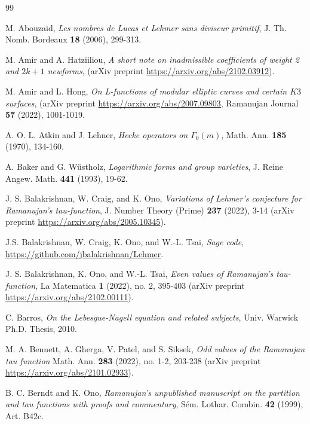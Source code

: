 \documentclass[12pt]{amsart}
\newcommand{\?}{\color{red}?}
\numberwithin{equation}{section}
\begin{document}
\begin{thebibliography}{99}

 M. Abouzaid, \emph{Les nombres de Lucas et Lehmer sans diviseur primitif},
J. Th. Nomb. Bordeaux \textbf{18} (2006), 299-313.

 M. Amir and A. Hatziiliou, \emph{A short note on inadmissible coefficients of weight 2 and $2k+1$ newforms}, (arXiv preprint \url{https://arxiv.org/abs/2102.03912}).

  M. Amir and L. Hong, \emph{On L-functions of modular elliptic curves and certain $K3$ surfaces}, (arXiv preprint \url{https://arxiv.org/abs/2007.09803},   Ramanujan Journal \textbf{57} (2022), 1001-1019.    



 A. O. L. Atkin and J. Lehner, \emph{Hecke operators on $\Gamma_0(m)$},
Math. Ann. \textbf{185} (1970), 134-160.

 A. Baker and G. W\"ustholz, \emph{Logarithmic forms and group varieties},
J. Reine Angew. Math. \textbf{441} (1993), 19-62.


 J. \thinspace{}S. Balakrishnan, W. Craig, and K. Ono, \emph{Variations of Lehmer's conjecture for Ramanujan's tau-function}, J. Number Theory (Prime)
\textbf{237} (2022), 3-14 (arXiv preprint \url{https://arxiv.org/abs/2005.10345}).

 J.\thinspace{}S. Balakrishnan, W. Craig, K. Ono, and W.-L. Tsai, \emph{Sage code},  \url{https://github.com/jbalakrishnan/Lehmer}.


 J. \thinspace{}S. Balakrishnan, K. Ono, and W.-L. Tsai, 
\emph{Even values of Ramanujan's tau-function}, La Matematica \textbf{1} (2022), no. 2, 395-403  (arXiv preprint \url{https://arxiv.org/abs/2102.00111}).


 C. Barros, \emph{On the Lebesgue-Nagell equation and related subjects},
Univ. Warwick Ph.D. Thesis, 2010.

 M. A. Bennett, A. Gherga, V. Patel, and S. Siksek,
 \emph{Odd values of the Ramanujan tau function} Math. Ann. \textbf{283} (2022), no. 1-2, 203-238 (arXiv preprint \url{https://arxiv.org/abs/2101.02933}).


 B. C. Berndt and K. Ono, \emph{Ramanujan's unpublished manuscript on the partition and tau functions with proofs
and commentary}, S\'em. Lothar. Combin. \textbf{42} (1999), Art. B42c.


\end{thebibliography}
\end{document}
